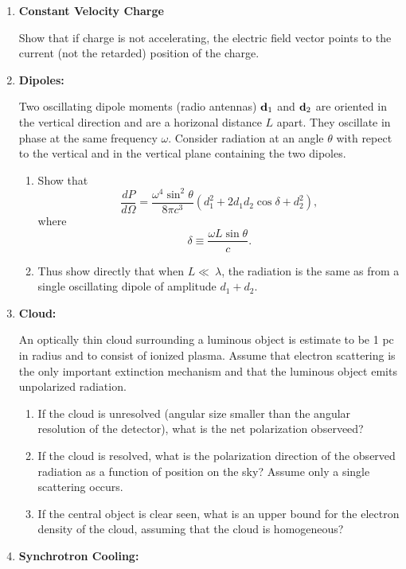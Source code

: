 \begin{enumerate}
\item{\bf Constant Velocity Charge}

Show that if charge is not accelerating, the electric field vector
points to the current (not the retarded) position of the charge.

\item{\bf Dipoles:}

Two oscillating dipole moments (radio antennas) ${\bf d}_1$ and ${\bf
d}_2$ are oriented in the vertical direction and are a horizonal
distance $L$ apart.  They oscillate in phase at the same frequency
$\omega$.   Consider radiation at an angle $\theta$ with repect to the
vertical and in the vertical plane containing the two dipoles.

\begin{enumerate}
\item Show that
\[
\frac{dP}{d\Omega} = \frac{\omega^4 \sin^2 \theta}{8 \pi c^3} \left (
d_1^2 + 2d_1 d_2 \cos \delta + d_2^2 \right ),
\]
where
\[
\delta \equiv \frac{\omega L \sin \theta}{c}.
\]
\item Thus show directly that when $L\ll\ \lambda$, the radiation is
  the same as from a single oscillating dipole of amplitude $d_1+d_2$.
\end{enumerate}

\item{\bf Cloud:}

An optically thin cloud surrounding a luminous object is estimate to
be 1 pc in radius and to consist of ionized plasma.  Assume that
electron scattering is the only important extinction mechanism and
that the luminous object emits unpolarized radiation.
\begin{enumerate}
\item If the cloud is unresolved (angular size smaller than the
  angular resolution of the detector), what is the net polarization
  observeed?
\item If the cloud is resolved,  what is the polarization direction of
  the observed radiation as a function of position on the sky?  Assume
  only a single scattering occurs.
\item If the central object is clear seen, what is an upper bound for
  the electron density of the cloud, assuming that the cloud is homogeneous?
\end{enumerate}

\item{\bf Synchrotron Cooling:}


\end{enumerate}
